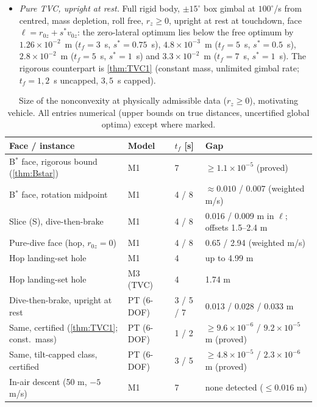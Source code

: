 \begin{itemize}[leftmargin=*,itemsep=2pt]
at $t_f=8/12/20$~s (planar: 0.70/0.80/0.82), and at $t_f=20$~s the optimizer cones through $359^\circ$ on the cap. Coning fills
about 87\% of capped dents, but not all of them.
\item \emph{Pure TVC, upright at rest.} Full rigid body, $\pm15^\circ$ box gimbal at $100^\circ$/s from centred, mass depletion, roll free,
$r_z\ge0$, upright at rest at touchdown, face $\ell=r_{0z}+s^*v_{0z}$: the zero-lateral optimum lies below the free optimum by
$1.26\times10^{-2}$~m ($t_f=3$~s, $s^*=0.75$~s), $4.8\times10^{-3}$~m ($t_f=5$~s, $s^*=0.5$~s), $2.8\times10^{-2}$~m ($t_f=5$~s, $s^*=1$~s) and
$3.3\times10^{-2}$~m ($t_f=7$~s, $s^*=1$~s). The rigorous counterpart is \cref{thm:TVC1} (constant mass, unlimited gimbal rate; $t_f=1,2$~s uncapped, $3,5$~s capped).
\end{itemize}

\begin{table}[t]\centering\small
\caption{Size of the nonconvexity at physically admissible data ($r_z\ge0$), motivating vehicle. All entries numerical (upper bounds on true
distances, uncertified global optima) except where marked.}\label{tab:gaps}
\begin{tabular}{@{}llll@{}}\toprule
Face / instance & Model & $t_f$ [s] & Gap \\\midrule
B$^*$ face, rigorous bound (\cref{thm:Bstar}) & M1 & 7 & $\ge1.1\times10^{-5}$ (proved) \\
B$^*$ face, rotation midpoint & M1 & 4 / 8 & $\approx0.010$ / $0.007$ (weighted m/s) \\
Slice (S), dive-then-brake & M1 & 4 / 8 & 0.016 / 0.009 m in $\ell$; offsets 1.5--2.4 m \\
Pure-dive face (hop, $r_{0z}=0$) & M1 & 4 / 8 & 0.65 / 2.94 (weighted m/s) \\
Hop landing-set hole & M1 & 4 & up to 4.99 m \\
Hop landing-set hole & M3 (TVC) & 4 & 1.74 m \\
Dive-then-brake, upright at rest & PT (6-DOF) & 3 / 5 / 7 & 0.013 / 0.028 / 0.033 m \\
Same, certified (\cref{thm:TVC1}; const.\ mass) & PT (6-DOF) & 1 / 2 & $\ge9.6\times10^{-6}$ / $9.2\times10^{-5}$ m (proved) \\
Same, tilt-capped class, certified & PT (6-DOF) & 3 / 5 & $\ge4.8\times10^{-5}$ / $2.3\times10^{-6}$ m (proved) \\
In-air descent (50 m, $-5$ m/s) & M1 & 7 & none detected ($\le0.016$ m) \\\bottomrule
\end{tabular}
\end{table}

